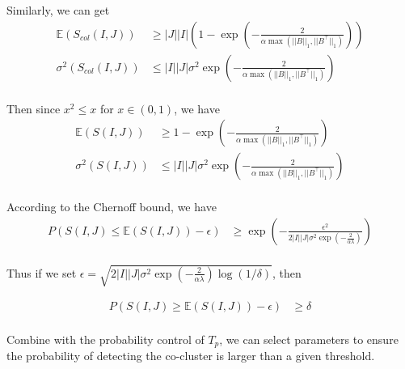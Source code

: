 \documentclass[12pt]{article}
\begin{document}
Similarly, we can get
\begin{align*}
    \mathbb{E}(S_{col}(I,J)) & \ge |J||I| \left(1 - \exp(-\frac{2}{\alpha \max(||B||_1, ||B^\top||_1)}) \right) \\
    \sigma^2(S_{col}(I,J))   & \le |I||J| \sigma^2 \exp(-\frac{2}{\alpha \max(||B||_1, ||B^\top||_1)})          \\
\end{align*}

Then since $x^2 \le x$ for $x \in (0,1)$, we have
\begin{align*}
    \mathbb{E}(S(I,J)) & \ge 1 - \exp(-\frac{2}{\alpha \max(||B||_1, ||B^\top||_1)})             \\
    \sigma^2(S(I,J))   & \le |I||J| \sigma^2 \exp(-\frac{2}{\alpha \max(||B||_1, ||B^\top||_1)}) \\
\end{align*}

According to the Chernoff bound, we have
\begin{align*}
    P(S(I,J) \le \mathbb{E}(S(I,J)) - \epsilon)
     & \ge \exp(-\frac{\epsilon^2}{2|I||J| \sigma^2 \exp(-\frac{2}{\alpha \lambda})}) \\
\end{align*}

Thus if we set $\epsilon = \sqrt{2|I||J| \sigma^2 \exp(-\frac{2}{\alpha \lambda}) \log(1/\delta)}$, then

\begin{align*}
    P(S(I,J) \ge \mathbb{E}(S(I,J)) - \epsilon) & \ge \delta \\
\end{align*}

Combine with the probability control of $T_p$, we can select parameters to ensure the probability of detecting the co-cluster is larger than a given threshold.
\end{document}
